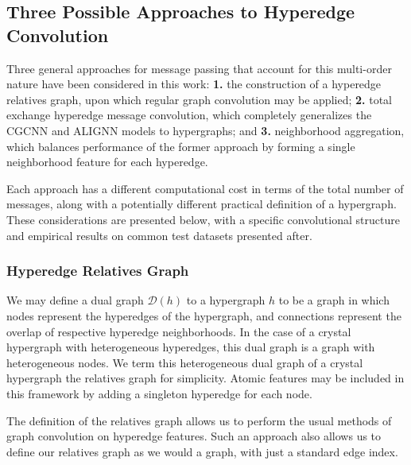\documentclass[twoside,twocolumn,9pt]{article}
\begin{document}
\subsection{Three Possible Approaches to Hyperedge Convolution}

Three general approaches for message passing that account for this multi-order nature have been considered in this work: \textbf{1.} the construction of a hyperedge relatives graph, upon which regular graph convolution may be applied; \textbf{2.} total exchange hyperedge message convolution, which completely generalizes the CGCNN \cite{cgcnn} and ALIGNN \cite{alignn} models to hypergraphs; and \textbf{3.} neighborhood aggregation, which balances performance of the former approach by forming a single neighborhood feature for each hyperedge.

Each approach has a different computational cost in terms of the total number of messages, along with a potentially different practical definition of a hypergraph. These considerations are presented below, with a specific convolutional structure and empirical results on common test datasets presented after.


\subsubsection{Hyperedge Relatives Graph}
We may define a dual graph $\mathcal{D}(h)$ to a hypergraph $h$ to be a graph in which nodes represent the hyperedges of the hypergraph, and connections represent the overlap of respective hyperedge neighborhoods. 
In the case of a crystal hypergraph with heterogeneous hyperedges, this dual graph is a graph with heterogeneous nodes. We term this heterogeneous dual graph of a crystal hypergraph the relatives graph for simplicity. Atomic features may be included in this framework by adding a singleton hyperedge for each node.

The definition of the relatives graph allows us to perform the usual methods of graph convolution on hyperedge features. Such an approach also allows us to define our relatives graph as we would a graph, with just a standard edge index.
\end{document}
